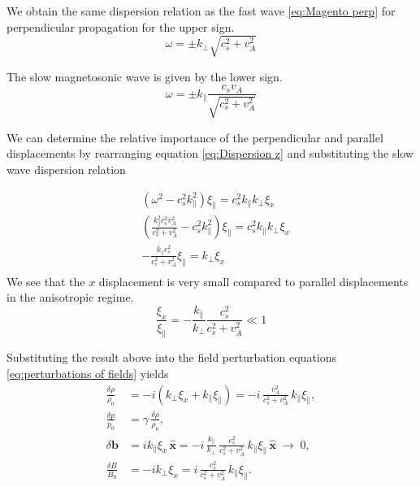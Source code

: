 We obtain the same dispersion relation as the fast wave \eqref{eq:Magento perp} for perpendicular propagation for the upper sign.
\begin{equation*}
    \omega =\pm k_{\perp}\sqrt{c_s^2 +v_A^2}
\end{equation*}

The slow magnetosonic wave is given by the lower sign. 
\begin{equation}
    \omega =\pm k_{\parallel}\frac{c_s v_A}{\sqrt{c_s^2 +v_A^2}}
    \label{eq:Slow wave speed}
\end{equation}

We can determine the relative importance of the perpendicular and parallel displacements by rearranging equation \eqref{eq:Dispersion z} and substituting the slow wave dispersion relation 

\begin{equation*}
    \begin{split}
        &(\omega^{2}- c_{s}^{2}k_{\parallel}^2)\xi_{\parallel} = c_{s}^{2}k_{\parallel}k_{\perp}\xi_{x}\\
        &\left(\frac{k_{\parallel}^2c_s^2v_A^2}{c_s^2+v_A^2}-c_s^2k_{\parallel}^2\right)\xi_{\parallel}= c_s^2k_{\parallel}k_{\perp}\xi_{x}\\
        &-\frac{k_{\parallel}c_s^2}{c_s^2+v_A^2}\xi_{\parallel}= k_{\perp}\xi_x\\
    \end{split}
\end{equation*}
We see that the \(x\) displacement is very small compared to parallel displacements in the anisotropic regime.
\begin{equation*}
    \frac{\xi_x}{\xi_{\parallel}} = - \frac{k_{\parallel}}{k_{\perp}} \frac{c_s^2}{c_s^2 + v_A^2} \ll 1
\end{equation*}

Substituting the result above into the field perturbation equations \eqref{eq:perturbations of fields} yields
\begin{equation*}
    \begin{split}
        \frac{\delta \rho}{\rho_0}
&= - i \left( k_\perp \xi_x + k_\parallel \xi_\parallel \right)
= - i \,\frac{v_A^2}{c_s^2 + v_A^2}\, k_\parallel \xi_\parallel , \\[6pt]
%
\frac{\delta p}{p_0}
&= \gamma \,\frac{\delta \rho}{\rho_0} , \\[6pt]
%
\delta \boldsymbol{b}
&= i k_\parallel \xi_x \,\hat{\boldsymbol{x}}
= - i \,\frac{k_\parallel}{k_\perp}\,
\frac{c_s^2}{c_s^2 + v_A^2}\,
k_\parallel \xi_\parallel \,\hat{\boldsymbol{x}}
\;\to\; 0 , \\[6pt]
%
\frac{\delta B}{B_0}
&= - i k_\perp \xi_x
= i \,\frac{c_s^2}{c_s^2 + v_A^2}\, k_\parallel \xi_\parallel .
    \end{split}
\end{equation*}

